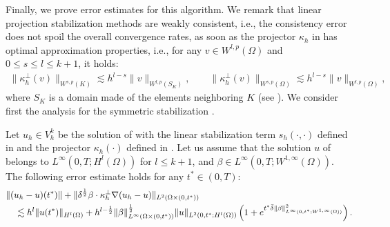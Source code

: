 Finally, we prove error estimates for this algorithm. We remark that linear projection stabilization methods are weakly consistent, i.e., the consistency error does not spoil the overall convergence rates, as soon as the projector $\kappa_h$ in  has optimal approximation properties, i.e., for any $v\in W^{l,p}(\Omega)$ and $0\leq s \leq l \leq k+1$, it holds:
\begin{align}\label{eq-orthapprox}
\|\kappa_h^\perp(v)\|_{W^{s,p}(K)} \lesssim h^{l-s} \|v\|_{W^{l,p}(S_K)}, \qquad 
\|\kappa_h^\perp(v)\|_{W^{s,p}(\Omega)} \lesssim h^{l-s} \|v\|_{W^{l,p}(\Omega)},
\end{align}
where $S_K$ is a domain made of the elements neighboring $K$ (see \cite{brenner_mathematical_2010}).  We consider first the analysis for the  symmetric stabilization .
\begin{theorem}[Convergence]\label{th:conv}
Let $u_h \in V_h^k$ be the solution of  with the linear stabilization term $s_h(\cdot,\cdot)$ defined in    and the projector $\kappa_h(\cdot)$ defined in . Let us assume that the solution $u$ of  belongs to $L^\infty(0,T;H^l(\Omega))$ for $l \leq k+1$, and $\beta\in L^\infty(0,T;W^{1,\infty}(\Omega))$. The following error estimate holds for any $t^* \in (0,T)$:
\begin{align*}
& \|(u_h-u)(t^*)\| + \| \delta^\frac{1}{2} \beta \cdot \kappa_h^\perp \nabla  (u_h-u) \|_{L^2(\Omega \times (0,t^*))}   \\
& \quad \lesssim 
  h^{l} \|u(t^*)\|_{H^l(\Omega)}  +  h^{l-\frac{1}{2}}\|\beta\|_{L^{\infty}(\Omega \times (0,t^*))}^{\frac{1}{2}} \|u\|_{L^2(0,t^*;H^l(\Omega))} \left( 1 + e^{t^* {\bar \delta } \|\beta  \|^2_{L^\infty(0,t^*;W^{1,\infty}(\Omega))}}
\right). 
\end{align*}
\end{theorem}


